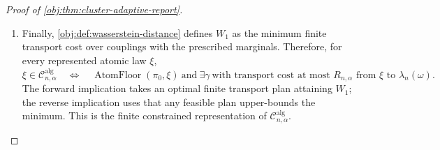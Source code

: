 \begin{proof}[Proof of \cref{obj:thm:cluster-adaptive-report}]
\begin{enumerate}
\item Finally, \cref{obj:def:wasserstein-distance} defines \(W_1\) as the
minimum finite transport cost over couplings with the prescribed marginals.
Therefore, for every represented atomic law \(\xi\),
\[
\xi\in\mathcal C^{\mathrm{alg}}_{n,\alpha}
\quad\Longleftrightarrow\quad
\operatorname{AtomFloor}(\pi_0,\xi)
\ \text{and}\
\exists\gamma\ \text{with transport cost at most }R_{n,\alpha}
\text{ from }\xi\text{ to }\widehat\lambda_n(\omega).
\]
The forward implication takes an optimal finite transport plan attaining
\(W_1\); the reverse implication uses that any feasible plan upper-bounds the
minimum.  This is the finite constrained representation of
\(\mathcal C^{\mathrm{alg}}_{n,\alpha}\). %
\end{enumerate}
\end{proof}

